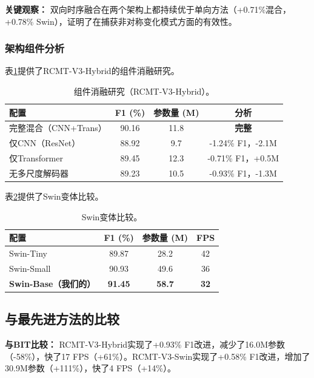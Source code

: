 \documentclass[journal]{IEEEtran}
\begin{document}
\textbf{关键观察：} 双向时序融合在两个架构上都持续优于单向方法（+0.71\%混合，+0.78\% Swin），证明了在捕获非对称变化模式方面的有效性。

\subsubsection{架构组件分析}

表\ref{tab:arch_hybrid}提供了RCMT-V3-Hybrid的组件消融研究。

\begin{table}[ht]
\centering
\caption{组件消融研究（RCMT-V3-Hybrid）。}
\label{tab:arch_hybrid}
\begin{tabular}{lccc}
\toprule
\textbf{配置} & \textbf{F1 (\%)} & \textbf{参数量 (M)} & \textbf{分析} \\
\midrule
    完整混合（CNN+Trans） & 90.16 & 11.8 & \textbf{完整} \\
    仅CNN（ResNet） & 88.92 & 9.7 & -1.24\% F1，-2.1M \\
    仅Transformer & 89.45 & 12.3 & -0.71\% F1，+0.5M \\
    无多尺度解码器 & 89.23 & 10.5 & -0.93\% F1，-1.3M \\
\bottomrule
\end{tabular}
\end{table}

表\ref{tab:swin_variants}提供了Swin变体比较。

\begin{table}[ht]
\centering
\caption{Swin变体比较。}
\label{tab:swin_variants}
\begin{tabular}{lccc}
\toprule
\textbf{配置} & \textbf{F1 (\%)} & \textbf{参数量 (M)} & \textbf{FPS} \\
\midrule
    Swin-Tiny & 89.87 & 28.2 & 42 \\
    Swin-Small & 90.93 & 49.6 & 36 \\
    \textbf{Swin-Base（我们的）} & \textbf{91.45} & \textbf{58.7} & \textbf{32} \\
\bottomrule
\end{tabular}
\end{table}

\subsection{与最先进方法的比较}

\textbf{与BIT比较：} RCMT-V3-Hybrid实现了+0.93\% F1改进，减少了16.0M参数（-58\%），快了17 FPS（+61\%）。RCMT-V3-Swin实现了+0.58\% F1改进，增加了30.9M参数（+111\%），快了4 FPS（+14\%）。
\end{document}
